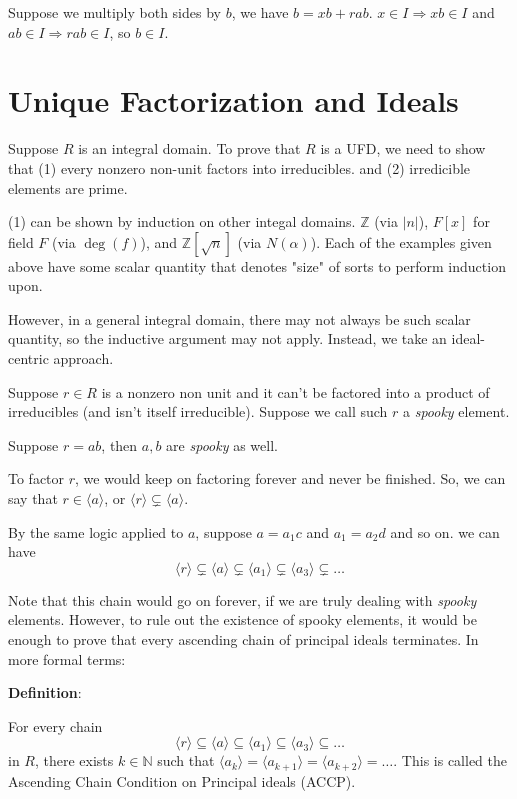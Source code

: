 \documentclass{article}
\begin{document}
\begin{multicols*}{2}
Suppose we multiply both sides by $b$, we have $b = xb + rab$. $x \in I \Rightarrow xb \in I$ and $ab \in I \Rightarrow rab \in I$, so $b \in I$.

\section{Unique Factorization and Ideals}

Suppose $R$ is an integral domain. To prove that $R$ is a UFD, we need to show that (1) every nonzero non-unit factors into irreducibles. and (2) irredicible elements are prime.

(1) can be shown by induction on other integal domains. $\mathbb{Z}$ (via $|n|$), $F[x]$ for field $F$ (via $\deg(f)$), and $\mathbb{Z}[\sqrt{n}]$ (via $N(\alpha)$). Each of the examples given above have some scalar quantity that denotes "size" of sorts to perform induction upon.

However, in a general integral domain, there may not always be such scalar quantity, so the inductive argument may not apply. Instead, we take an ideal-centric approach.

Suppose $r \in R$ is a nonzero non unit and it can't be factored into a product of irreducibles (and isn't itself irreducible). Suppose we call such $r$ a \textit{spooky} element.

Suppose $r = ab$, then $a, b$ are \textit{spooky} as well. 

To factor $r$, we would keep on factoring forever and never be finished. So, we can say that $r \in \langle a \rangle$, or $\langle r \rangle \subsetneq \langle a \rangle$. 

By the same logic applied to $a$, suppose $a = a_1 c$ and $a_1 = a_2 d$ and so on. we can have \[\langle r \rangle \subsetneq \langle a \rangle \subsetneq \langle a_1 \rangle \subsetneq \langle a_3 \rangle\subsetneq \dots\]

Note that this chain would go on forever, if we are truly dealing with \textit{spooky} elements. However, to rule out the existence of spooky elements, it would be enough to prove that every ascending chain of principal ideals terminates. In more formal terms:

\textbf{Definition}:

For every chain \[\langle r \rangle \subseteq \langle a \rangle \subseteq \langle a_1 \rangle \subseteq \langle a_3 \rangle\subseteq\dots\] in $R$, there exists $k \in \mathbb{N}$ such that $\langle a_k \rangle = \langle a_{k+1} \rangle = \langle a_{k+2} \rangle = \dots$. This is called the Ascending Chain Condition on Principal ideals (ACCP).


\end{multicols*}
\end{document}
